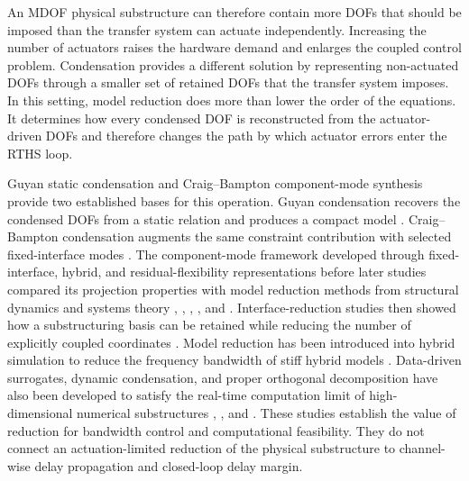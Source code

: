 \documentclass[a4paper,fleqn,review,12pt]{cas-sc}
\numberwithin{equation}{section}
\begin{document}
An MDOF physical substructure can therefore contain more DOFs that should be imposed than the transfer system can actuate independently. Increasing the number of actuators raises the hardware demand and enlarges the coupled control problem. Condensation provides a different solution by representing non-actuated DOFs through a smaller set of retained DOFs that the transfer system imposes. In this setting, model reduction does more than lower the order of the equations. It determines how every condensed DOF is reconstructed from the actuator-driven DOFs and therefore changes the path by which actuator errors enter the RTHS loop.

Guyan static condensation and Craig--Bampton component-mode synthesis provide two established bases for this operation. Guyan condensation recovers the condensed DOFs from a static relation and produces a compact model \cite{Guyan1965}. Craig--Bampton condensation augments the same constraint contribution with selected fixed-interface modes \cite{CraigBampton1968}. The component-mode framework developed through fixed-interface, hybrid, and residual-flexibility representations before later studies compared its projection properties with model reduction methods from structural dynamics and systems theory \cite{Hurty1965}, \cite{MacNeal1971}, \cite{Rubin1975}, \cite{Besselink2013}, and \cite{Benner2015}. Interface-reduction studies then showed how a substructuring basis can be retained while reducing the number of explicitly coupled coordinates \cite{Krattiger2019}. Model reduction has been introduced into hybrid simulation to reduce the frequency bandwidth of stiff hybrid models \cite{Miraglia2020}. Data-driven surrogates, dynamic condensation, and proper orthogonal decomposition have also been developed to satisfy the real-time computation limit of high-dimensional numerical substructures \cite{Tsokanas2022}, \cite{Mucha2023}, and \cite{Zhang2024}. These studies establish the value of reduction for bandwidth control and computational feasibility. They do not connect an actuation-limited reduction of the physical substructure to channel-wise delay propagation and closed-loop delay margin.
\end{document}

